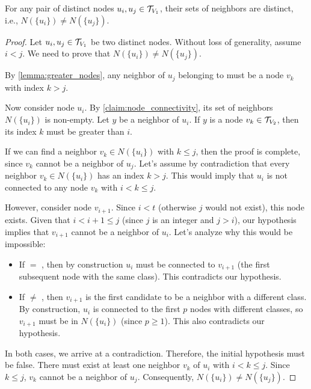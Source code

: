 \begin{lemma} \label{lemma:distinct_neighborhoods}
    For any pair of distinct nodes $u_i, u_j \in \mathcal{T}_{V_1}$, their sets of neighbors are distinct, i.e., $N(\{u_i\}) \neq N(\{u_j\})$.
\end{lemma}
\begin{proof}
    Let $u_i, u_j \in \mathcal{T}_{V_1}$ be two distinct nodes. Without loss of generality, assume $i < j$. We need to prove that $N(\{u_i\}) \neq N(\{u_j\})$.

    By \cref{lemma:greater_nodes}, any neighbor of $u_j$ belonging to  must be a node $v_k$ with index $k > j$.

    Now consider node $u_i$. By \cref{claim:node_connectivity}, its set of neighbors $N(\{u_i\})$ is non-empty. Let $y$ be a neighbor of $u_i$. If $y$ is a node $v_k \in \mathcal{T}_{V_2}$, then its index $k$ must be greater than $i$.

    If we can find a neighbor $v_k \in N(\{u_i\})$ with $k \leq j$, then the proof is complete, since $v_k$ cannot be a neighbor of $u_j$. Let's assume by contradiction that every neighbor $v_k \in N(\{u_i\})$ has an index $k > j$. This would imply that $u_i$ is not connected to any node $v_k$ with $i < k \leq j$.

    However, consider node $v_{i+1}$. Since $i < t$ (otherwise $j$ would not exist), this node exists. Given that $i < i+1 \leq j$ (since $j$ is an integer and $j>i$), our hypothesis implies that $v_{i+1}$ cannot be a neighbor of $u_i$. Let's analyze why this would be impossible:
    \begin{itemize}
        \item If  $=$ , then by construction $u_i$ must be connected to $v_{i+1}$ (the first subsequent node with the same class). This contradicts our hypothesis.
        \item If  $\neq$ , then $v_{i+1}$ is the first candidate to be a neighbor with a different class. By construction, $u_i$ is connected to the first $p$ nodes with different classes, so $v_{i+1}$ must be in $N(\{u_i\})$ (since $p \geq 1$). This also contradicts our hypothesis.
    \end{itemize}
    In both cases, we arrive at a contradiction. Therefore, the initial hypothesis must be false. There must exist at least one neighbor $v_k$ of $u_i$ with $i < k \leq j$. Since $k \leq j$, $v_k$ cannot be a neighbor of $u_j$. Consequently, $N(\{u_i\}) \neq N(\{u_j\})$.
\end{proof}

